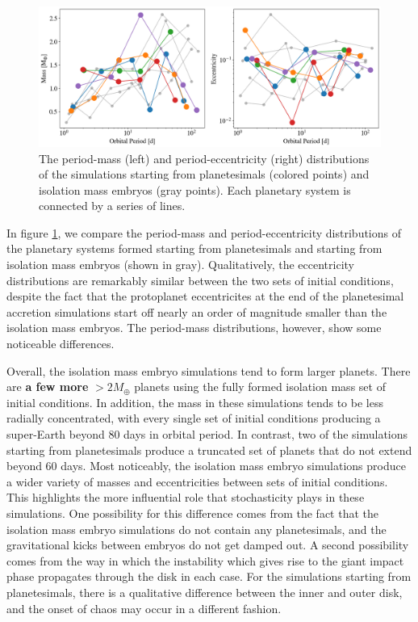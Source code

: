 \begin{figure}
\begin{center}
    \includegraphics[width=\textwidth]{figures/stip/per_mass_ecc_iso_comp.png}
    \caption{The period-mass (left) and period-eccentricity (right) distributions of the simulations starting from planetesimals (colored points) and isolation mass embryos (gray points). Each planetary system is connected by a series of lines.\label{fig:per_mass_ecc_iso_comp}}
\end{center}
\end{figure}

In figure \ref{fig:per_mass_ecc_iso_comp}, we compare the period-mass and period-eccentricity distributions of the planetary systems formed starting from planetesimals and starting from isolation mass embryos (shown in gray). Qualitatively, the eccentricity distributions are remarkably similar between the two sets of initial conditions, despite the fact that the protoplanet eccentricites at the end of the planetesimal accretion simulations start off nearly an order of magnitude smaller than the isolation mass embryos. The period-mass distributions, however, show some noticeable differences.

Overall, the isolation mass embryo simulations tend to form larger planets. There are \textbf{a few more} $> 2 M_{\oplus}$ planets using the fully formed isolation mass set of initial conditions. In addition, the mass in these simulations tends to be less radially concentrated, with every single set of initial conditions producing a super-Earth beyond 80 days in orbital period. In contrast, two of the simulations starting from planetesimals produce a truncated set of planets that do not extend beyond 60 days. Most noticeably, the isolation mass embryo simulations produce a wider variety of masses and eccentricities between sets of initial conditions. This highlights the more influential role that stochasticity plays in these simulations. One possibility for this difference comes from the fact that the isolation mass embryo simulations do not contain any planetesimals, and the gravitational kicks between embryos do not get damped out. A second possibility comes from the way in which the instability which gives rise to the giant impact phase propagates through the disk in each case. For the simulations starting from planetesimals, there is a qualitative difference between the inner and outer disk, and the onset of chaos may occur in a different fashion.

